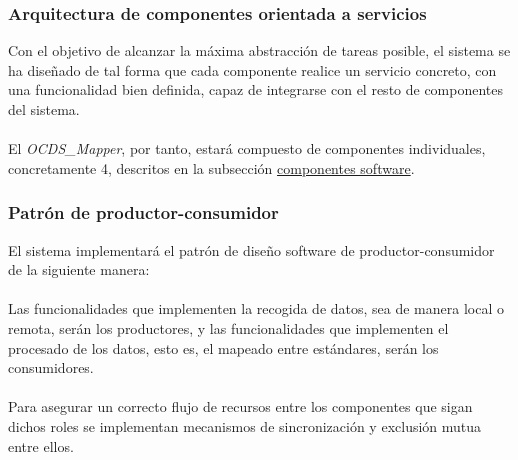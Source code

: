         \subsubsection{Arquitectura de componentes orientada a servicios}
            Con el objetivo de alcanzar la máxima abstracción de tareas posible, el sistema se ha diseñado de tal forma que cada componente realice un servicio concreto, con una funcionalidad bien definida, capaz de integrarse con el resto de componentes del sistema.
            \\ \\
            El \textit{OCDS\_Mapper}, por tanto, estará compuesto de componentes individuales, concretamente 4, descritos en la subsección \hyperref[subsubsec:componentes]{componentes software}.
            
        \subsubsection{Patrón de productor-consumidor}
            El sistema implementará el patrón de diseño software de productor-consumidor de la siguiente manera:
            \\ \\
            Las funcionalidades que implementen la recogida de datos, sea de manera local o remota, serán los productores, y las funcionalidades que implementen el procesado de los datos, esto es, el mapeado entre estándares, serán los consumidores.
            \\ \\
            Para asegurar un correcto flujo de recursos entre los componentes que sigan dichos roles se implementan mecanismos de sincronización y exclusión mutua entre ellos.
        
